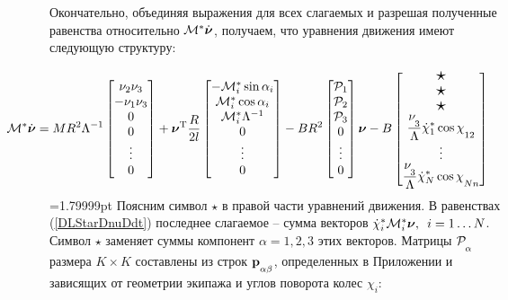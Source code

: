 Окончательно, объединяя выражения для всех слагаемых и разрешая полученные равенства относительно $\mathcal{M}^*\dot{\boldsymbol{\mathbf{\nu}}}$, получаем, что уравнения движения имеют следующую структуру:

\begin{eqnarray*}
    \hspace{-45pt}
    \M^*\dot{\vnu} = 
    MR^2\Lambda^{-1}\begin{bmatrix}
        \nu_2\nu_3\\
        -\nu_1\nu_3\\
        0\\
        0\\
        \vdots
        \\
        0
    \end{bmatrix}
    +\vnu^\mathrm{T}
    \frac{R}{2l}
    \begin{bmatrix}
        -\M^*_i \sin\alpha_i\\
        \M^*_i \cos\alpha_i\\
        \M^*_i \Lambda^{-1}\\
        0\\
        \vdots
        \\
        0
    \end{bmatrix}
    -BR^2
    \begin{bmatrix}
        \Prhs_1\\
        \Prhs_2\\
        \Prhs_3\\
        0\\
        \vdots
        \\
        0
    \end{bmatrix}
    \vnu
    -B\begin{bmatrix}
        \scalebox{1.5}{$\star$}\\
        \scalebox{1.5}{$\star$}\\
        \scalebox{1.5}{$\star$}\\
        \fontdimen16\textfont2=5pt
        \ddfrac{\nu_3}{\Lambda}\dot{\chi}_1^*\cos\chi_{12}\\
        \vdots
        \\
        \ddfrac{\nu_3}{\Lambda}\dot{\chi}_N^*\cos\chi_{Nn}
    \end{bmatrix}
\end{eqnarray*}
\begin{equation}\label{eq:full_system}
\end{equation}
=1.79999pt
Поясним символ $\star$ в правой части уравнений движения. В равенствах (\ref{DLStarDnuDdt}) последнее слагаемое -- сумма векторов $\dot{\chi}_i^*\mathcal{M}^*_i\boldsymbol{\mathbf{\nu}}, \enspace i = 1 \ldots N$. Символ $\star$ заменяет суммы компонент $\alpha = 1,2,3$ этих векторов. Матрицы $\Prhs_\alpha$ размера $K\times K$ составлены из строк $\prhs_{\alpha\beta}$, определенных в Приложении и зависящих от геометрии экипажа и углов поворота колес $\chi_i$:
